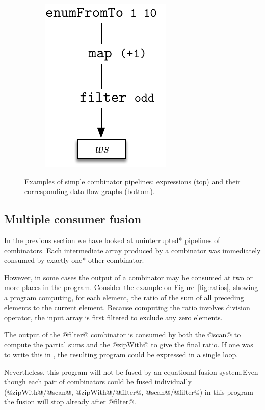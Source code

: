 \documentclass[preamble.tex]{subfiles}
\begin{document}
\begin{figure}
\begin{subfigure}{.33\textwidth}
\includegraphics[center,scale=0.85]{img/simple-pipeline-c}%
\end{subfigure}%

\caption{Examples of simple combinator pipelines: \Haskell expressions (top) and their corresponding data flow graphs (bottom).}
\label{fig:simple-piplines}
\end{figure}


\subsection{Multiple consumer fusion}

In the previous section we have looked at \*uninterrupted* pipelines of combinators. Each intermediate array produced by a combinator was immediately consumed by \*exactly one* other combinator.

However, in some cases the output of a combinator may be consumed at two or more places in the program. Consider the example on Figure~\ref{fig:ratios}, showing a program computing, for each element, the ratio of the sum of all preceding elements to the current element. Because computing the ratio involves division operator, the input array is first filtered to exclude any zero elements.

The output of the @filter@ combinator is consumed by both the @scan@ to compute the partial sums and the @zipWith@ to give the final ratio. If one was to write this in \C, the resulting program could be expressed in a single loop.

Nevertheless, this program will not be fused by an equational fusion system.\ieqfusion Even though each pair of combinators could be fused individually (@zipWith@/@scan@, @zipWith@/@filter@, @scan@/@filter@) in this program the fusion will stop already after @filter@.
\end{document}
